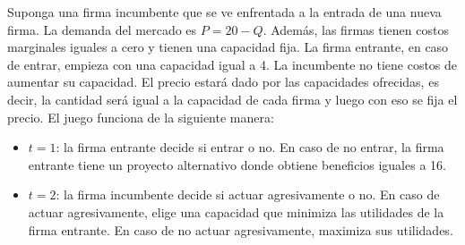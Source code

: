 \question Suponga una firma incumbente que se ve enfrentada a la entrada de una nueva firma. La demanda del mercado es $P = 20 - Q$. Además, las firmas tienen costos marginales iguales a cero y tienen una capacidad fija. La firma entrante, en caso de entrar, empieza con una capacidad igual a 4. La incumbente no tiene costos de aumentar su capacidad. El precio estará dado por las capacidades ofrecidas, es decir, la cantidad será igual a la capacidad de cada firma y luego con eso se fija el precio. El juego funciona de la siguiente manera:
\begin{itemize}
  \item $t=1$: la firma entrante decide si entrar o no. En caso de no entrar, la firma entrante tiene un proyecto alternativo donde obtiene beneficios iguales a 16.
  \item $t=2$: la firma incumbente decide si actuar agresivamente o no. En caso de actuar agresivamente, elige una capacidad que minimiza las utilidades de la firma entrante. En caso de no actuar agresivamente, maximiza sus utilidades.
\end{itemize}
